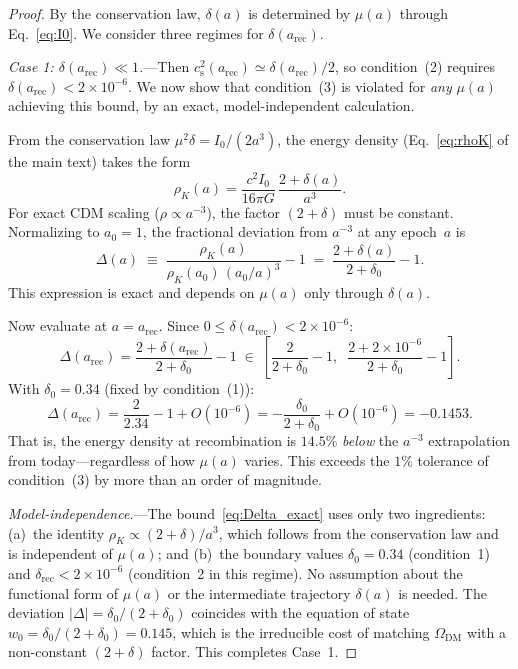 \documentclass[prd,twocolumn,superscriptaddress,longbibliography,floatfix]{revtex4-2}
\newcommand{\cs}{c_{\mathrm{s}}}
\begin{document}
\begin{proof}
By the conservation law, $\delta(a)$ is determined by
$\mu(a)$ through Eq.~\eqref{eq:I0}.  We consider three
regimes for $\delta(a_{\mathrm{rec}})$.

\emph{Case 1: $\delta(a_{\mathrm{rec}}) \ll 1$.}---Then
$\cs^2(a_{\mathrm{rec}}) \simeq \delta(a_{\mathrm{rec}})/2$,
so condition~(2) requires
$\delta(a_{\mathrm{rec}}) < 2 \times 10^{-6}$.
We now show that condition~(3) is violated for
\emph{any} $\mu(a)$ achieving this bound, by an exact,
model-independent calculation.

From the conservation law
$\mu^2\delta = I_0/(2a^3)$,
the energy density (Eq.~\eqref{eq:rhoK} of the main text)
takes the form
\begin{equation}
\rho_K(a) = \frac{c^2 I_0}{16\pi G}\,
\frac{2+\delta(a)}{a^3}.
\label{eq:rhoK_I0}
\end{equation}
For exact CDM scaling ($\rho \propto a^{-3}$), the
factor $(2{+}\delta)$ must be constant.
Normalizing to $a_0 = 1$, the fractional deviation from
$a^{-3}$ at any epoch~$a$ is
\begin{equation}
\Delta(a) \;\equiv\;
\frac{\rho_K(a)}{\rho_K(a_0)\,(a_0/a)^3} - 1
\;=\; \frac{2+\delta(a)}{2+\delta_0} - 1.
\label{eq:Delta_def}
\end{equation}
This expression is exact and depends on $\mu(a)$
only through $\delta(a)$.

Now evaluate at $a = a_{\mathrm{rec}}$.
Since $0 \leq \delta(a_{\mathrm{rec}}) < 2\times10^{-6}$:
\begin{equation}
\Delta(a_{\mathrm{rec}})
= \frac{2 + \delta(a_{\mathrm{rec}})}{2 + \delta_0} - 1
\;\in\;\left[\frac{2}{2{+}\delta_0} - 1,\;\;
\frac{2{+}2\times10^{-6}}{2{+}\delta_0} - 1\right].
\label{eq:Delta_bound}
\end{equation}
With $\delta_0 = 0.34$ (fixed by condition~(1)):
\begin{equation}
\Delta(a_{\mathrm{rec}})
= \frac{2}{2.34} - 1 + O(10^{-6})
= -\frac{\delta_0}{2+\delta_0} + O(10^{-6})
= -0.1453.
\label{eq:Delta_exact}
\end{equation}
That is, the energy density at recombination is
$14.5\%$ \emph{below} the $a^{-3}$ extrapolation from
today---regardless of how $\mu(a)$ varies.  This
exceeds the $1\%$ tolerance of condition~(3) by more
than an order of magnitude.

\emph{Model-independence.}---The bound~\eqref{eq:Delta_exact}
uses only two ingredients:
(a)~the identity $\rho_K \propto (2{+}\delta)/a^3$, which
follows from the conservation law and is independent of
$\mu(a)$; and
(b)~the boundary values $\delta_0 = 0.34$ (condition~1)
and $\delta_{\mathrm{rec}} < 2\times10^{-6}$
(condition~2 in this regime).
No assumption about the functional form of $\mu(a)$ or
the intermediate trajectory $\delta(a)$ is needed.
The deviation
$|\Delta| = \delta_0/(2{+}\delta_0)$ coincides
with the equation of state $w_0 = \delta_0/(2{+}\delta_0)
= 0.145$, which is the irreducible cost of matching
$\Omega_{\mathrm{DM}}$ with a non-constant $(2{+}\delta)$
factor.
This completes Case~1.


\end{proof}
\end{document}
